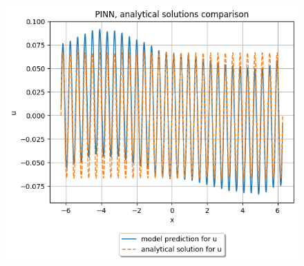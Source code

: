 \documentclass{article}
\begin{document}
\begin{figure}[H]
  \includegraphics[width=\linewidth]{figures/second3.png}
\end{figure}
\end{document}
